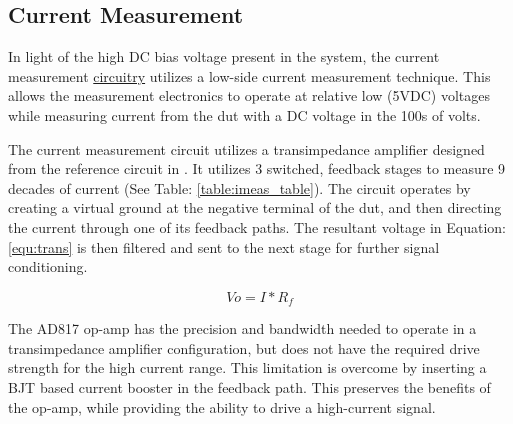 \subsection{Current Measurement}
\label{sec:iMeas}

In light of the high DC bias voltage present in the system, the current measurement \hyperlink{sch:discharging}{circuitry} utilizes a low-side current measurement technique. This allows the measurement electronics to operate at relative low (5VDC) voltages while measuring current from the \gls{dut} with a DC voltage in the 100s of volts.



The current measurement circuit utilizes a transimpedance amplifier designed from the reference circuit in \cite{steve_thesis}. It utilizes 3 switched, feedback stages to measure 9 decades of current (See Table: \ref{table:imeas_table}). The circuit operates by creating a virtual ground at the negative terminal of the \gls{dut}, and then directing the current through one of its feedback paths. The resultant voltage in Equation: \eqref{equ:trans} is then filtered and sent to the next stage for further signal conditioning.

\begin{equation}
\label{equ:trans}
Vo = I*R_f
\end{equation}

The AD817 op-amp has the precision and bandwidth needed to operate in a transimpedance amplifier configuration, but does not have the required drive strength for the  high current range. This limitation is overcome by inserting a BJT based current booster in the feedback path. This preserves the benefits of the op-amp, while providing the ability to drive a high-current signal.

